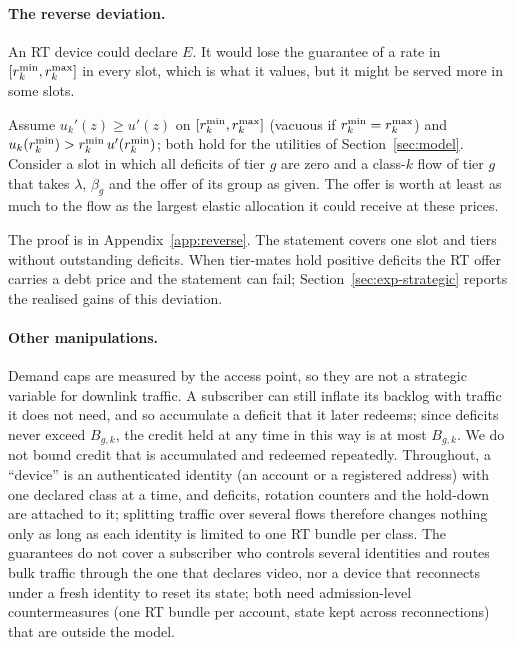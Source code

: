 \paragraph{The reverse deviation.}
An RT device could declare $E$.
It would lose the guarantee of a rate in $[r^{\min}_k,r^{\max}_k]$ in every slot, which is what it values, but it might be served more in some slots.

\begin{proposition}\label{prop:reverse}
Assume $u_k'(z)\ge u'(z)$ on $[r^{\min}_k,r^{\max}_k]$ (vacuous if $r^{\min}_k=r^{\max}_k$) and $u_k(r^{\min}_k)>r^{\min}_k\,u'(r^{\min}_k)$; both hold for the utilities of Section~\ref{sec:model}.
Consider a slot in which all deficits of tier $g$ are zero and a class-$k$ flow of tier $g$ that takes $\lambda$, $\beta_g$ and the offer of its group as given.
The offer is worth at least as much to the flow as the largest elastic allocation it could receive at these prices.
\end{proposition}

The proof is in Appendix~\ref{app:reverse}.
The statement covers one slot and tiers without outstanding deficits.
When tier-mates hold positive deficits the RT offer carries a debt price and the statement can fail; Section~\ref{sec:exp-strategic} reports the realised gains of this deviation.

\paragraph{Other manipulations.}
Demand caps are measured by the access point, so they are not a strategic variable for downlink traffic.
A subscriber can still inflate its backlog with traffic it does not need, and so accumulate a deficit that it later redeems; since deficits never exceed $B_{g,k}$, the credit held at any time in this way is at most $B_{g,k}$. We do not bound credit that is accumulated and redeemed repeatedly.
Throughout, a ``device'' is an authenticated identity (an account or a registered address) with one declared class at a time, and deficits, rotation counters and the hold-down are attached to it; splitting traffic over several flows therefore changes nothing only as long as each identity is limited to one RT bundle per class.
The guarantees do not cover a subscriber who controls several identities and routes bulk traffic through the one that declares video, nor a device that reconnects under a fresh identity to reset its state; both need admission-level countermeasures (one RT bundle per account, state kept across reconnections) that are outside the model.

